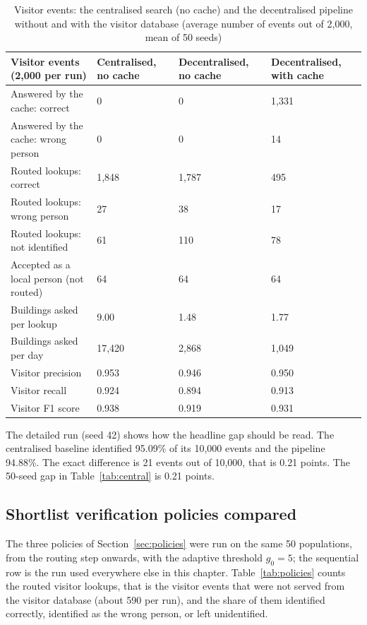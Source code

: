 \documentclass[12pt,a4paper,oneside]{report}
\begin{document}
\begin{table}[htbp]
\centering
\caption{Visitor events: the centralised search (no cache) and the decentralised pipeline without and with the visitor database (average number of events out of 2,000, mean of 50 seeds)}\label{tab:vdb}
{\small\setlength{\tabcolsep}{4pt}\renewcommand{\arraystretch}{1.2}
\begin{tabular}{|p{5.6cm}|p{2.7cm}|p{3.1cm}|p{3.1cm}|}\hline
\textbf{Visitor events (2,000 per run)} & \textbf{Centralised, no cache} & \textbf{Decentralised, no cache} & \textbf{Decentralised, with cache}\\\hline
Answered by the cache: correct & 0 & 0 & 1,331\\\hline
Answered by the cache: wrong person & 0 & 0 & 14\\\hline
Routed lookups: correct & 1,848 & 1,787 & 495\\\hline
Routed lookups: wrong person & 27 & 38 & 17\\\hline
Routed lookups: not identified & 61 & 110 & 78\\\hline
Accepted as a local person (not routed) & 64 & 64 & 64\\\hline
Buildings asked per lookup & 9.00 & 1.48 & 1.77\\\hline
Buildings asked per day & 17,420 & 2,868 & 1,049\\\hline
Visitor precision & 0.953 & 0.946 & 0.950\\\hline
Visitor recall & 0.924 & 0.894 & 0.913\\\hline
Visitor F1 score & 0.938 & 0.919 & 0.931\\\hline
\end{tabular}}
\end{table}



The detailed run (seed 42) shows how the headline gap should be read. The centralised baseline identified 95.09\% of its 10,000 events and the pipeline 94.88\%. The exact difference is 21 events out of 10,000, that is 0.21 points. The 50-seed gap in Table~\ref{tab:central} is 0.21 points.

\subsection{Shortlist verification policies compared}\label{sec:res-policies}
The three policies of Section~\ref{sec:policies} were run on the same 50 populations, from the routing step onwards, with the adaptive threshold $g_0=5$; the sequential row is the run used everywhere else in this chapter. Table~\ref{tab:policies} counts the routed visitor lookups, that is the visitor events that were not served from the visitor database (about 590 per run), and the share of them identified correctly, identified as the wrong person, or left unidentified.
\end{document}
